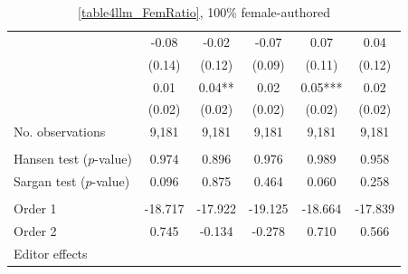 \begin{table}
    \footnotesize
    \centering
    \begin{threeparttable}
        \caption{\autoref{table4llm_FemRatio}, 100\% female-authored}
        \label{table4llm_Fem100}
        \begin{tabular}{p{3cm}S@{}S@{}S@{}S@{}S@{}}
            \toprule
            &{}&{}&{}&{}&{}\\
            \midrule
            &       -0.08   &       -0.02   &       -0.07   &        0.07   &        0.04   \\
                                          &      (0.14)   &      (0.12)   &      (0.09)   &      (0.11)   &      (0.12)   \\
            &        0.01   &        0.04** &        0.02   &        0.05***&        0.02   \\
                                          &      (0.02)   &      (0.02)   &      (0.02)   &      (0.02)   &      (0.02)   \\
            \midrule
            No. observations      &       9,181   &       9,181   &       9,181   &       9,181   &       9,181   \\
             \\\quad Hansen test (\(p\)-value)&       0.974   &       0.896   &       0.976   &       0.989   &       0.958   \\
            \quad Sargan test (\(p\)-value)&       0.096   &       0.875   &       0.464   &       0.060   &       0.258   \\
             \\\quad Order 1&     -18.717   &     -17.922   &     -19.125   &     -18.664   &     -17.839   \\
            \quad Order 2                 &       0.745   &      -0.134   &      -0.278   &       0.710   &       0.566   \\
            \midrule
            Editor effects        &           {}   &           {}   &           {}   &           {}   &           {}   \\

\end{tabular}
\end{threeparttable}
\end{table}
